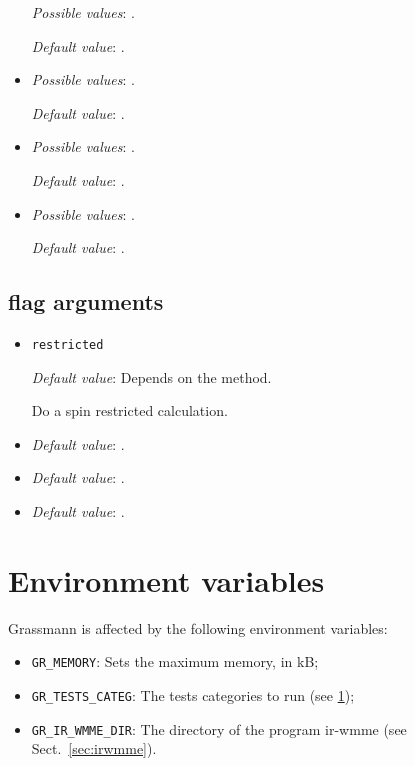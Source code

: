\begin{itemize}
  \emph{Possible values}: .

  \emph{Default value}: .

\item \verb++

  \emph{Possible values}: .

  \emph{Default value}: .

\item \verb++

  \emph{Possible values}: .

  \emph{Default value}: .

\item \verb++

  \emph{Possible values}: .

  \emph{Default value}: .



  
\end{itemize}

\subsection{flag arguments}

\begin{itemize}
\item \verb+restricted+

  \emph{Default value}: Depends on the method.

  Do a spin restricted calculation.

\item \verb++

  \emph{Default value}: .

\item \verb++

  \emph{Default value}: .

\item \verb++

  \emph{Default value}: .


\end{itemize}


\section{Environment variables}

Grassmann is affected by the following environment variables:
\begin{itemize}
\item \verb+GR_MEMORY+: Sets the maximum memory, in kB;
\item \verb+GR_TESTS_CATEG+: The tests categories to run (see \ref{});
\item \verb+GR_IR_WMME_DIR+: The directory of the program ir-wmme (see Sect.~\ref{sec:irwmme}).
\end{itemize}




